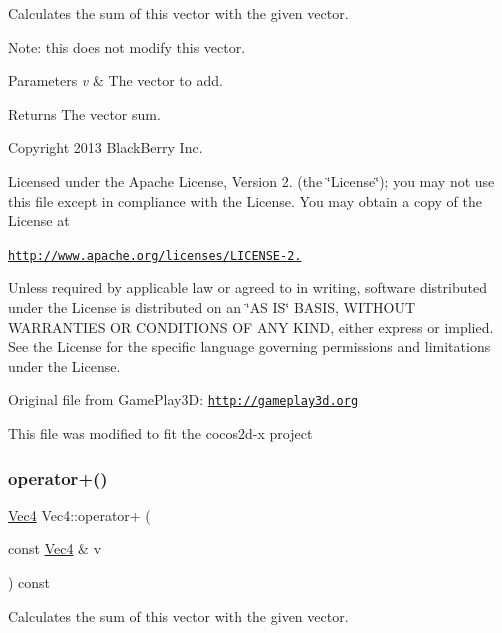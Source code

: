 Calculates the sum of this vector with the given vector.

Note\+: this does not modify this vector.


\begin{DoxyParams}{Parameters}
{\em v} & The vector to add. \\
\hline
\end{DoxyParams}
\begin{DoxyReturn}{Returns}
The vector sum.
\end{DoxyReturn}
Copyright 2013 Black\+Berry Inc.

Licensed under the Apache License, Version 2. (the \char`\"{}\+License\char`\"{}); you may not use this file except in compliance with the License. You may obtain a copy of the License at

\href{http://www.apache.org/licenses/LICENSE-2.0}{\tt http\+://www.\+apache.\+org/licenses/\+L\+I\+C\+E\+N\+S\+E-\/2.}

Unless required by applicable law or agreed to in writing, software distributed under the License is distributed on an \char`\"{}\+A\+S I\+S\char`\"{} B\+A\+S\+IS, W\+I\+T\+H\+O\+UT W\+A\+R\+R\+A\+N\+T\+I\+ES OR C\+O\+N\+D\+I\+T\+I\+O\+NS OF A\+NY K\+I\+ND, either express or implied. See the License for the specific language governing permissions and limitations under the License.

Original file from Game\+Play3D\+: \href{http://gameplay3d.org}{\tt http\+://gameplay3d.\+org}

This file was modified to fit the cocos2d-\/x project \mbox{\label{classVec4_a8855350c075fbe08afdb8033fcd61643}} 
\subsubsection{\texorpdfstring{operator+()}{operator+()}\hspace{0.1cm}{\footnotesize\ttfamily [2/2]}}
{\footnotesize\ttfamily \hyperlink{classVec4}{Vec4} Vec4\+::operator+ (\begin{DoxyParamCaption}\item[{const \hyperlink{classVec4}{Vec4} \&}]{v }\end{DoxyParamCaption}) const\hspace{0.3cm}{\ttfamily [inline]}}

Calculates the sum of this vector with the given vector.


